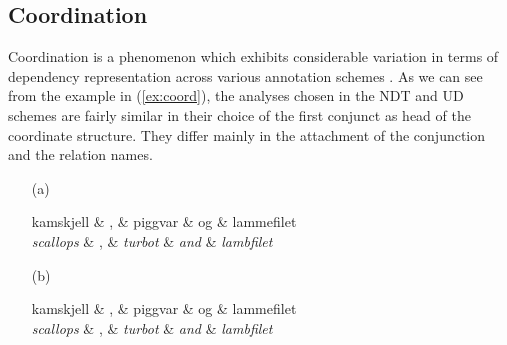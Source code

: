\documentclass[10pt, a4paper]{article}
\let\w=\emph
\begin{document}
\subsection{Coordination}
Coordination is a phenomenon which exhibits considerable variation in terms
of dependency representation across various annotation schemes \cite{Pop:Mar:Ste:13}.
As we can see from the example in (\ref{ex:coord}), the analyses
chosen in the NDT and UD schemes are fairly similar in their choice of
the first conjunct as head of the coordinate structure. They differ
mainly in the attachment of the conjunction and the relation names.
\begin{example}
\label{ex:coord}
\begin{itemize}
\item[(a)]
    \begin{dependency}[arc edge, text only label, theme=simple]
        \begin{deptext}[column sep=.2cm]
          kamskjell \& , \& piggvar \& og \& lammefilet \\
          \w{scallops} \& , \& \w{turbot} \& \w{and} \& \w{lambfilet}\\
        \end{deptext}
    \end{dependency}
\item[(b)]
    \begin{dependency}[arc edge, text only label, theme=simple]
        \begin{deptext}[column sep=.2cm]
          kamskjell \& , \& piggvar \& og \& lammefilet \\
          \w{scallops} \& , \& \w{turbot} \& \w{and} \& \w{lambfilet}\\
        \end{deptext}
    \end{dependency}
\end{itemize}
\end{example}
\end{document}
